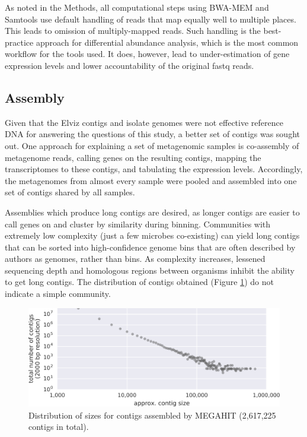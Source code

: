 As noted in the Methods, all computational steps using BWA-MEM and Samtools use default handling of reads that map equally well to multiple places.
This leads to omission of multiply-mapped reads.
Such handling is the best-practice approach for differential abundance analysis, which is the most common workflow for the tools used.
It does, however, lead to under-estimation of gene expression levels and lower accountability of the original fastq reads. %


\subsection{Assembly}

Given that the Elviz contigs and isolate genomes were not effective reference DNA for answering the questions of this study, a better set of contigs was sought out.
One approach for explaining a set of metagenomic samples is co-assembly of metagenome reads, calling genes on the resulting contigs, mapping the transcriptomes to these contigs, and tabulating the expression levels.
Accordingly, the metagenomes from almost every sample were pooled and assembled into one set of contigs shared by all samples.

Assemblies which produce long contigs are desired, as longer contigs are easier to call genes on and cluster by similarity during binning.
Communities with extremely low complexity (just a few microbes co-existing) can yield long contigs that can be sorted into high-confidence genome bins that are often described by authors as genomes, rather than bins.
As complexity increases, lessened sequencing depth and homologous regions between organisms inhibit the ability to get long contigs.
The distribution of contigs obtained (Figure \ref{fig:contig_lengths}) do not indicate a simple community.


\begin{figure}[H]
\centering
    \includegraphics[width=1.0\textwidth]{./tex/chapter2/figures/170123_frac_reads_binned_at_different_contig_lengths_and_total--INKSCAPED.pdf}
    \begin{singlespace}
    \caption[Distribution of contig sizes]{
        Distribution of sizes for contigs assembled by MEGAHIT (2,617,225 contigs in total).}
    \label{fig:contig_lengths}
    \end{singlespace}
\end{figure}



